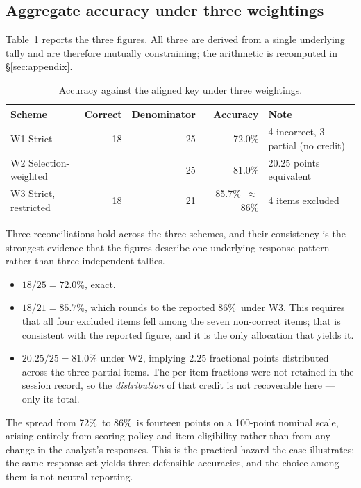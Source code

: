 \documentclass[11pt]{article}
\newcommand{\pct}{\%}
\begin{document}
\subsection{Aggregate accuracy under three weightings}
\label{sec:accuracy}

Table~\ref{tab:accuracy} reports the three figures. All three are derived
from a single underlying tally and are therefore mutually constraining; the
arithmetic is recomputed in \S\ref{sec:appendix}.

\begin{table}[htbp]
\centering
\caption{Accuracy against the aligned key under three weightings.}
\label{tab:accuracy}
\begin{tabular}{@{}lrrrl@{}}
\toprule
Scheme & Correct & Denominator & Accuracy & Note \\
\midrule
W1 Strict & 18 & 25 & 72.0\pct & 4 incorrect, 3 partial (no credit) \\
W2 Selection-weighted & --- & 25 & 81.0\pct & 20.25 points equivalent \\
W3 Strict, restricted & 18 & 21 & 85.7\pct\ $\approx$ 86\pct & 4 items excluded \\
\bottomrule
\end{tabular}
\end{table}

Three reconciliations hold across the three schemes, and their consistency
is the strongest evidence that the figures describe one underlying response
pattern rather than three independent tallies.

\begin{itemize}
\item $18/25 = 72.0\pct$, exact.
\item $18/21 = 85.7\pct$, which rounds to the reported 86\pct\ under W3.
      This requires that all four excluded items fell among the seven
      non-correct items; that is consistent with the reported figure, and it
      is the only allocation that yields it.
\item $20.25/25 = 81.0\pct$ under W2, implying $2.25$ fractional points
      distributed across the three partial items. The per-item fractions
      were not retained in the session record, so the \emph{distribution}
      of that credit is not recoverable here --- only its total.
\end{itemize}

The spread from 72\pct\ to 86\pct\ is fourteen points on a 100-point
nominal scale, arising entirely from scoring policy and item eligibility
rather than from any change in the analyst's responses. This is the
practical hazard the case illustrates: the same response set yields three
defensible accuracies, and the choice among them is not neutral reporting.
\end{document}
